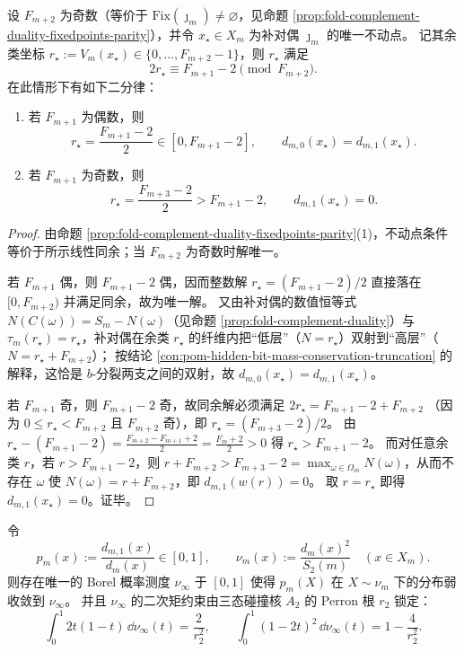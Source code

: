 \begin{proposition}[补对偶不动点稳定型的隐藏位分裂二分律]\label{prop:pom-hiddenbit-complement-fixedpoint-bsplit-dichotomy}
设 \(F_{m+2}\) 为奇数（等价于 \(\mathrm{Fix}(\jmath_m)\neq\varnothing\)，见命题 \ref{prop:fold-complement-duality-fixedpoints-parity}），并令 \(x_\star\in X_m\) 为补对偶 \(\jmath_m\) 的唯一不动点。
记其余类坐标 \(r_\star:=V_m(x_\star)\in\{0,\dots,F_{m+2}-1\}\)，则 \(r_\star\) 满足
\[
2r_\star\equiv F_{m+1}-2\pmod{F_{m+2}}.
\]
在此情形下有如下二分律：
\begin{enumerate}
\normalfont
  \item 若 \(F_{m+1}\) 为偶数，则
  \[
  r_\star=\frac{F_{m+1}-2}{2}\in[0,F_{m+1}-2],
  \qquad
  d_{m,0}(x_\star)=d_{m,1}(x_\star).
  \]
  \item 若 \(F_{m+1}\) 为奇数，则
  \[
  r_\star=\frac{F_{m+3}-2}{2}>F_{m+1}-2,
  \qquad
  d_{m,1}(x_\star)=0.
  \]
\end{enumerate}
\end{proposition}
\begin{proof}
由命题 \ref{prop:fold-complement-duality-fixedpoints-parity}(1)，不动点条件等价于所示线性同余；当 \(F_{m+2}\) 为奇数时解唯一。

若 \(F_{m+1}\) 偶，则 \(F_{m+1}-2\) 偶，因而整数解
\(
r_\star=(F_{m+1}-2)/2
\)
直接落在 \([0,F_{m+2})\) 并满足同余，故为唯一解。
又由补对偶的数值恒等式 \(N(C(\omega))=S_m-N(\omega)\)（见命题 \ref{prop:fold-complement-duality}）与 \(\tau_m(r_\star)=r_\star\)，补对偶在余类 \(r_\star\) 的纤维内把“低层”（\(N=r_\star\)）双射到“高层”（\(N=r_\star+F_{m+2}\)）；
按结论 \ref{con:pom-hidden-bit-mass-conservation-truncation} 的解释，这恰是 \(b\)-分裂两支之间的双射，故 \(d_{m,0}(x_\star)=d_{m,1}(x_\star)\)。

若 \(F_{m+1}\) 奇，则 \(F_{m+1}-2\) 奇，故同余解必须满足
\(
2r_\star=F_{m+1}-2+F_{m+2}
\)
（因为 \(0\le r_\star<F_{m+2}\) 且 \(F_{m+2}\) 奇），即
\(
r_\star=(F_{m+3}-2)/2
\)。
由
\(
r_\star-(F_{m+1}-2)=\frac{F_{m+2}-F_{m+1}+2}{2}=\frac{F_m+2}{2}>0
\)
得 \(r_\star>F_{m+1}-2\)。
而对任意余类 \(r\)，若 \(r>F_{m+1}-2\)，则 \(r+F_{m+2}>F_{m+3}-2=\max_{\omega\in\Omega_m}N(\omega)\)，从而不存在 \(\omega\) 使 \(N(\omega)=r+F_{m+2}\)，即 \(d_{m,1}(w(r))=0\)。
取 \(r=r_\star\) 即得 \(d_{m,1}(x_\star)=0\)。证毕。
\end{proof}

\begin{conjecture}[碰撞加权下跃迁概率的重整化极限律]\label{conj:pom-hiddenbit-jump-renormalization-limit-law}
令
\[
p_m(x):=\frac{d_{m,1}(x)}{d_m(x)}\in[0,1],
\qquad
\nu_m(x):=\frac{d_m(x)^2}{S_2(m)}\quad(x\in X_m).
\]
则存在唯一的 Borel 概率测度 \(\nu_\infty\) 于 \([0,1]\) 使得 \(p_m(X)\) 在 \(X\sim\nu_m\) 下的分布弱收敛到 \(\nu_\infty\)。
并且 \(\nu_\infty\) 的二次矩约束由三态碰撞核 \(A_2\) 的 Perron 根 \(r_2\) 锁定：
\[
\int_{0}^{1}2t(1-t)\,\dd\nu_\infty(t)=\frac{2}{r_2^2},
\qquad
\int_{0}^{1}(1-2t)^2\,\dd\nu_\infty(t)=1-\frac{4}{r_2^2}.
\]
\end{conjecture}

\endinput
